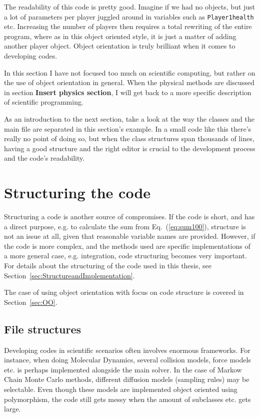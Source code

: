 The readability of this code is pretty good. Imagine if we had no objects, but just a lot of parameters per player juggled around in variables such as \verb+Player1health+ etc. Increasing the number of players then requires a total rewriting of the entire program, where as in this object oriented style, it is just a matter of adding another player object. Object orientation is truly brilliant when it comes to developing codes. 

In this section I have not focused too much on scientific computing, but rather on the use of object orientation in general. When the physical methods are discussed in section \textbf{Insert physics section}, I will get back to a more specific description of scientific programming.

As an introduction to the next section, take a look at the way the classes and the main file are separated in this section's example. In a small code like this there's really no point of doing so, but when the class structures span thousands of lines, having a good structure and the right editor is crucial to the development process and the code's readability.


\section{Structuring the code}

Structuring a code is another source of compromises. If the code is short, and has a direct purpose, e.g. to calculate the sum from Eq.~(\ref{eq:sum100}), structure is not an issue at all, given that reasonable variable names are provided. However, if the code is more complex, and the methods used are specific implementations of a more general case, e.g. integration, code structuring becomes very important. For details about the structuring of the code used in this thesis, see Section~\ref{sec:StructureandImplementation}.

The case of using object orientation with focus on code structure is covered in Section~\ref{sec:OO}.

\subsection{File structures}

Developing codes in scientific scenarios often involves enormous frameworks. For instance, when doing Molecular Dynamics, several collision models, force models etc. is perhaps implemented alongside the main solver. In the case of Markow Chain Monte Carlo methods, different diffusion models (sampling rules) may be selectable. Even though these models are implemented object oriented using polymorphism, the code still gets messy when the amount of subclasses etc. gets large. 

